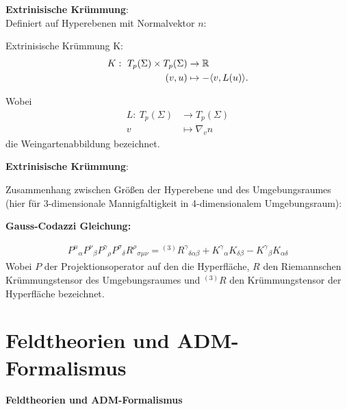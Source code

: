 \documentclass[mathserif]{beamer}
\newcommand{\inHS}{{}^{(3)}\!}
\theoremstyle{definition}
\begin{document}
	\begin{frame}
		\textbf{Extrinisische Krümmung}:\\
				Definiert auf Hyperebenen mit Normalvektor $n$:
				\begin{definition} Extrinisische Krümmung K:
					\begin{align}
						K:\ T_p(\Sigma)\times T_p(\Sigma)&\rightarrow \mathbb{R} \label{def:extrcurv} \\
							(v,u)&\mapsto -\langle v,L(u)\rangle.\notag
					\end{align}
				\end{definition}
				Wobei
				\begin{align*}
					L:\ T_p(\Sigma)&\rightarrow T_p(\Sigma) \\
						v&\mapsto \nabla_v n
				\end{align*}
				die Weingartenabbildung bezeichnet.
	\end{frame}
	\begin{frame}
		\textbf{Extrinisische Krümmung}:\\
				\begin{center}
					
				\end{center}
	\end{frame}
	\begin{frame}
		Zusammenhang zwischen Größen der Hyperebene und des Umgebungsraumes (hier f\"ur 3-dimensionale Mannigfaltigkeit in 4-dimensionalem Umgebungsraum):
		\begin{center}
			\textbf{Gauss-Codazzi Gleichung:}
		\end{center}
		\begin{align}
			{P^\mu}_\alpha{P^\nu}_\beta{P^\gamma}_\rho{P^\sigma}_\delta {R^\rho}_{\sigma\mu\nu}={\inHS R^\gamma}_{\delta\alpha\beta}+{K^\gamma}_\alpha K_{\delta\beta}-{K^\gamma}_\beta K_{\alpha\delta}
		\end{align}
		Wobei $P$ der Projektionsoperator auf den die Hyperfl\"ache, $R$ den Riemannschen Krümmungstensor des Umgebungsraumes und $\inHS R$ den Krümmungstensor der Hyperfläche bezeichnet.
	\end{frame}
\section{Feldtheorien und ADM-Formalismus}
\begin{frame}
\begin{center}
	\large \textbf{Feldtheorien und ADM-Formalismus}
\end{center}
\end{frame}
\end{document}
